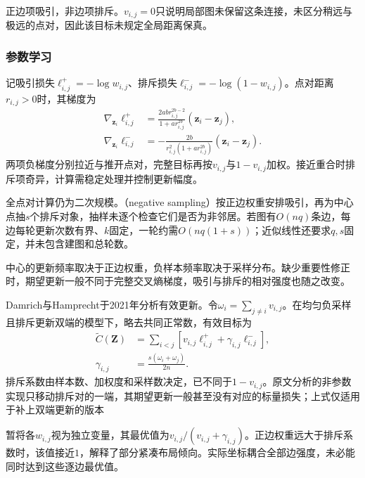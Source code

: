 正边项吸引，非边项排斥。$v_{i,j}=0$只说明局部图未保留这条连接，未区分稍远与极远的点对，因此该目标未规定全局距离保真。

\subsubsection{参数学习}

记吸引损失$\ell^+_{i,j}=-\log w_{i,j}$、排斥损失$\ell^-_{i,j}=-\log(1-w_{i,j})$。点对距离$r_{i,j}>0$时，其梯度为
\begin{equation}
  \label{eq:dim-umap-pair-gradient}
  \begin{aligned}
    \nabla_{\bm{z}_i}\ell^+_{i,j}
      &=\frac{2ab r_{i,j}^{2b-2}}
        {1+a r_{i,j}^{2b}}(\bm{z}_i-\bm{z}_j),\\
    \nabla_{\bm{z}_i}\ell^-_{i,j}
      &=-\frac{2b}
        {r_{i,j}^2(1+a r_{i,j}^{2b})}
        (\bm{z}_i-\bm{z}_j).
  \end{aligned}
\end{equation}
两项负梯度分别拉近与推开点对，完整目标再按$v_{i,j}$与$1-v_{i,j}$加权。接近重合时排斥项奇异，计算需稳定处理并控制更新幅度。

全点对计算仍为二次规模。（negative sampling）按正边权重安排吸引，再为中心点抽$s$个排斥对象，抽样未逐个检查它们是否为非邻居。若图有$O(nq)$条边，每边每轮更新次数有界、$k$固定，一轮约需$O(nq(1+s))$；近似线性还要求$q,s$固定，并未包含建图和总轮数。

中心的更新频率取决于正边权重，负样本频率取决于采样分布。缺少重要性修正时，期望更新一般不同于完整交叉熵梯度，吸引与排斥的相对强度也随之改变。

Damrich与Hamprecht于2021年分析有效更新。令$\omega_i=\sum_{j\ne i}v_{i,j}$。在均匀负采样且排斥更新双端的模型下，略去共同正常数，有效目标为
\begin{equation}
  \label{eq:dim-umap-effective-loss}
  \begin{aligned}
    \widetilde C(\bm{Z})
      &=\sum_{i<j}\left[
        v_{i,j}\ell^+_{i,j}
        +\gamma_{i,j}\ell^-_{i,j}\right],\\
    \gamma_{i,j}&=\frac{s(\omega_i+\omega_j)}{2n}.
  \end{aligned}
\end{equation}
排斥系数由样本数、加权度和采样数决定，已不同于$1-v_{i,j}$。原文分析的非参数实现只移动排斥对的一端，其期望更新一般甚至没有对应的标量损失；上式仅适用于补上双端更新的版本

暂将各$w_{i,j}$视为独立变量，其最优值为$v_{i,j}/(v_{i,j}+\gamma_{i,j})$。正边权重远大于排斥系数时，该值接近$1$，解释了部分紧凑布局倾向。实际坐标耦合全部边强度，未必能同时达到这些逐边最优值。

